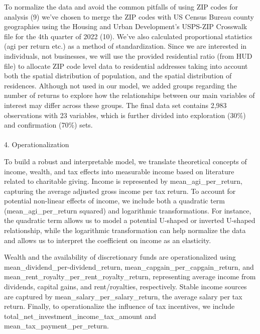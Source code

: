 \documentclass[
  letterpaper,
  DIV=11,
  numbers=noendperiod]{scrartcl}
\makeatletter
\let\oldparagraph\paragraph
\renewcommand{\paragraph}{
    \@ifstar
      \xxxParagraphStar
      \xxxParagraphNoStar
  }
\newcommand{\xxxParagraphStar}[1]{\oldparagraph*{#1}\mbox{}}
\newcommand{\xxxParagraphNoStar}[1]{\oldparagraph{#1}\mbox{}}
\makeatother
\begin{document}
To normalize the data and avoid the common pitfalls of using ZIP codes
for analysis (9) we've chosen to merge the ZIP codes with US Census
Bureau county geographies using the Housing and Urban Development's
USPS-ZIP Crosswalk file for the 4th quarter of 2022 (10). We've also
calculated proportional statistics (agi per return etc.) as a method of
standardization. Since we are interested in individuals, not businesses,
we will use the provided residential ratio (from HUD file) to allocate
ZIP code level data to residential addresses taking into account both
the spatial distribution of population, and the spatial distribution of
residences. Although not used in our model, we added groups regarding
the number of returns to explore how the relationships between our main
variables of interest may differ across these groups. The final data set
contains 2,983 observations with 23 variables, which is further divided
into exploration (30\%) and confirmation (70\%) sets.

\paragraph{4. Operationalization}\label{operationalization}

To build a robust and interpretable model, we translate theoretical
concepts of income, wealth, and tax effects into measurable income based
on literature related to charitable giving. Income is represented by
mean\_agi\_per\_return, capturing the average adjusted gross income per
tax return. To account for potential non-linear effects of income, we
include both a quadratic term (mean\_agi\_per\_return squared) and
logarithmic transformations. For instance, the quadratic term allows us
to model a potential U-shaped or inverted U-shaped relationship, while
the logarithmic transformation can help normalize the data and allows us
to interpret the coefficient on income as an elasticity.

Wealth and the availability of discretionary funds are operationalized
using mean\_dividend\_per-dividend\_return,
mean\_capgain\_per\_capgain\_return, and
mean\_rent\_royalty\_per\_rent\_royalty\_return, representing average
income from dividends, capital gains, and rent/royalties, respectively.
Stable income sources are captured by mean\_salary\_per\_salary\_return,
the average salary per tax return. Finally, to operationalize the
influence of tax incentives, we include
total\_net\_investment\_income\_tax\_amount and
mean\_tax\_payment\_per\_return.
\end{document}

